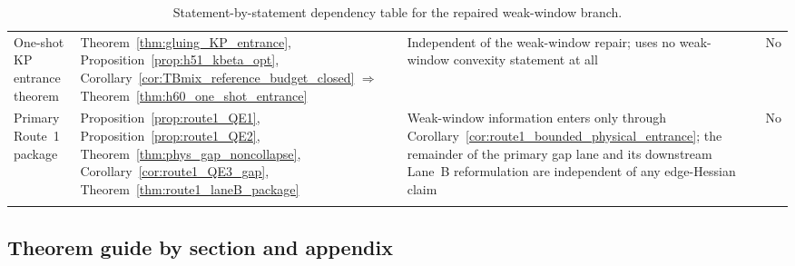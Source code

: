 \begin{longtable}{@{}
>{\RaggedRight\arraybackslash}p{}
>{\RaggedRight\arraybackslash}p{}
>{\RaggedRight\arraybackslash}p{}
>{\RaggedRight\arraybackslash}p{}@{}}
One-shot KP entrance theorem & Theorem~\ref{thm:gluing_KP_entrance}, Proposition~\ref{prop:h51_kbeta_opt}, Corollary~\ref{cor:TBmix_reference_budget_closed} $\Rightarrow$ Theorem~\ref{thm:h60_one_shot_entrance} & Independent of the weak-window repair; uses no weak-window convexity statement at all & No\\[0.35em]

Primary Route~1 package & Proposition~\ref{prop:route1_QE1}, Proposition~\ref{prop:route1_QE2}, Theorem~\ref{thm:phys_gap_noncollapse}, Corollary~\ref{cor:route1_QE3_gap}, Theorem~\ref{thm:route1_laneB_package} & Weak-window information enters only through Corollary~\ref{cor:route1_bounded_physical_entrance}; the remainder of the primary gap lane and its downstream Lane~B reformulation are independent of any edge-Hessian claim & No\\
\bottomrule
\caption{Statement-by-statement dependency table for the repaired weak-window branch.}
\label{tab:weak_window_dependency_table}
\end{longtable}
\endgroup

\subsection{Theorem guide by section and appendix}
\label{subsec:theorem_file_map}

